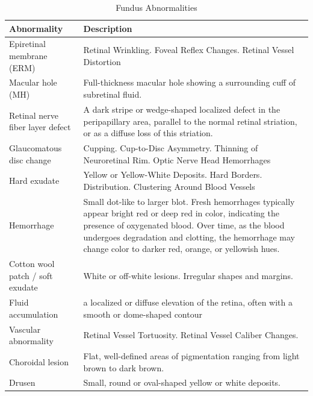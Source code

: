 \documentclass{article}
\begin{document}
	{
		\fontsize{9}{12}\selectfont
		{
			\begin{longtable}{lp{3.8in}}
				\caption{Fundus Abnormalities}
				\label{tb:fundus-ab}\\
				\toprule
				Abnormality&Description\\
				\toprule
				
				\multicolumn{1}{l}{Epiretinal membrane (ERM)}
				& Retinal Wrinkling.  Foveal Reflex Changes. Retinal Vessel Distortion\\
				
				\multicolumn{1}{l}{Macular hole (MH)} & Full-thickness macular hole showing a surrounding cuff of subretinal fluid.\\
				
				\multicolumn{1}{l}{Retinal nerve fiber layer defect} & A dark stripe or wedge-shaped localized defect in the peripapillary area, parallel to the normal retinal striation, or as a diffuse loss of this striation. \\
				
				\multicolumn{1}{l}{Glaucomatous disc change} & Cupping.  Cup-to-Disc Asymmetry. Thinning of Neuroretinal Rim. Optic Nerve Head Hemorrhages \\
				
				\multicolumn{1}{l}{Hard exudate} & Yellow or Yellow-White Deposits.  Hard Borders.  Distribution.  Clustering Around Blood Vessels\\
				
				\multicolumn{1}{l}{Hemorrhage} & Small dot-like to larger blot.  Fresh hemorrhages typically appear bright red or deep red in color, indicating the presence of oxygenated blood. Over time, as the blood undergoes degradation and clotting, the hemorrhage may change color to darker red, orange, or yellowish hues.\\
				
				\multicolumn{1}{l}{Cotton wool patch / soft exudate} & White or off-white lesions.  Irregular shapes and margins.\\
				
				\multicolumn{1}{l}{Fluid accumulation} &  a localized or diffuse elevation of the retina, often with a smooth or dome-shaped contour\\
				
				\multicolumn{1}{l}{Vascular abnormality} & Retinal Vessel Tortuosity.  Retinal Vessel Caliber Changes.  \\
				
				\multicolumn{1}{l}{Choroidal lesion} & Flat, well-defined areas of pigmentation ranging from light brown to dark brown. \\
				
				\multicolumn{1}{l}{Drusen} & Small, round or oval-shaped yellow or white deposits.\\
																
				\bottomrule
			\end{longtable}
		}
	}
	
\end{document}
